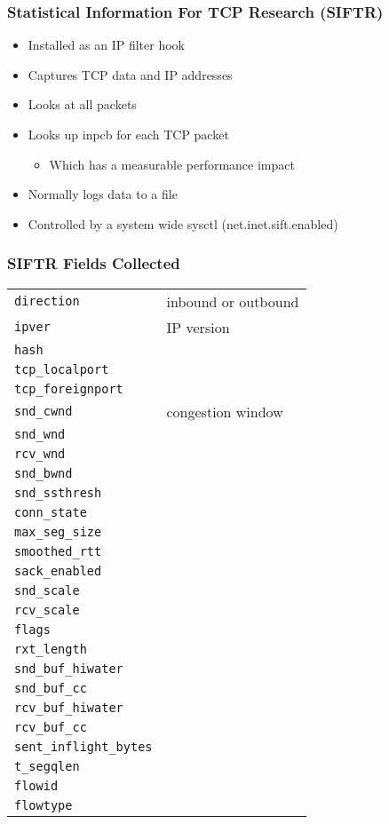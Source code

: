 \documentclass[pdftex]{beamer}
\begin{document}
\begin{frame}
  \frametitle{Statistical Information For TCP Research (SIFTR)}
  \begin{itemize}
  \item Installed as an IP filter hook
  \item Captures TCP data and IP addresses
  \item Looks at all packets
  \item Looks up inpcb for each TCP packet
    \begin{itemize}
    \item Which has a measurable performance impact
    \end{itemize}
  \item Normally logs data to a file
  \item Controlled by a system wide sysctl (net.inet.sift.enabled)
  \end{itemize}
\end{frame}

\begin{frame}[fragile]
  \frametitle{SIFTR Fields Collected}
  \begin{tabular*}{1.0\linewidth}{|l|l|}
    \verb|direction| & inbound or outbound \\
    \verb|ipver| & IP version \\
    \verb|hash| & \\
    \verb|tcp_localport| & \\
    \verb|tcp_foreignport| & \\
    \verb|snd_cwnd| & congestion window \\
    \verb|snd_wnd| & \\
    \verb|rcv_wnd| & \\
    \verb|snd_bwnd| & \\
    \verb|snd_ssthresh| & \\
    \verb|conn_state| & \\
    \verb|max_seg_size| & \\
    \verb|smoothed_rtt | & \\
    \verb|sack_enabled| & \\
    \verb|snd_scale| & \\
    \verb|rcv_scale| & \\
    \verb|flags| & \\
    \verb|rxt_length| & \\
    \verb|snd_buf_hiwater| & \\
    \verb|snd_buf_cc| & \\
    \verb|rcv_buf_hiwater| & \\
    \verb|rcv_buf_cc| & \\
    \verb|sent_inflight_bytes| & \\
    \verb|t_segqlen| & \\
    \verb|flowid| & \\
    \verb|flowtype| & 
  \end{tabular*}
\end{frame}
\end{document}
